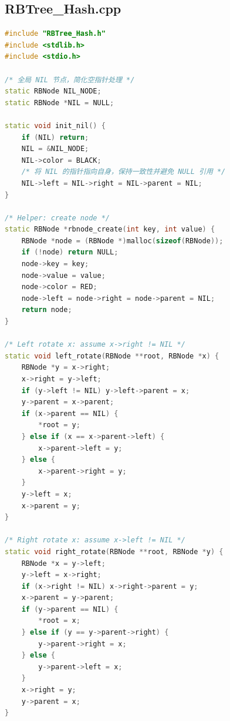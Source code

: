 \documentclass[12pt,a4paper]{article}
\begin{document}
\subsection{RBTree\_Hash.cpp}
\begin{lstlisting}[language=C++]
#include "RBTree_Hash.h"
#include <stdlib.h>
#include <stdio.h>

/* 全局 NIL 节点，简化空指针处理 */
static RBNode NIL_NODE;
static RBNode *NIL = NULL;

static void init_nil() {
    if (NIL) return;
    NIL = &NIL_NODE;
    NIL->color = BLACK;
    /* 将 NIL 的指针指向自身，保持一致性并避免 NULL 引用 */
    NIL->left = NIL->right = NIL->parent = NIL;
}

/* Helper: create node */
static RBNode *rbnode_create(int key, int value) {
    RBNode *node = (RBNode *)malloc(sizeof(RBNode));
    if (!node) return NULL;
    node->key = key;
    node->value = value;
    node->color = RED;
    node->left = node->right = node->parent = NIL;
    return node;
}

/* Left rotate x: assume x->right != NIL */
static void left_rotate(RBNode **root, RBNode *x) {
    RBNode *y = x->right;
    x->right = y->left;
    if (y->left != NIL) y->left->parent = x;
    y->parent = x->parent;
    if (x->parent == NIL) {
        *root = y;
    } else if (x == x->parent->left) {
        x->parent->left = y;
    } else {
        x->parent->right = y;
    }
    y->left = x;
    x->parent = y;
}

/* Right rotate x: assume x->left != NIL */
static void right_rotate(RBNode **root, RBNode *y) {
    RBNode *x = y->left;
    y->left = x->right;
    if (x->right != NIL) x->right->parent = y;
    x->parent = y->parent;
    if (y->parent == NIL) {
        *root = x;
    } else if (y == y->parent->right) {
        y->parent->right = x;
    } else {
        y->parent->left = x;
    }
    x->right = y;
    y->parent = x;
}


\end{lstlisting}
\end{document}
